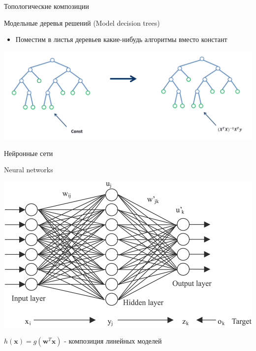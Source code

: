 \documentclass[10pt]{beamer}
\begin{document}
\begin{frame}{Топологические композиции}
\begin{block}{Модельные деревья решений (Model decision trees)}
\end{block}
\begin{itemize}
    \item Поместим в листья деревьев какие-нибудь алгоритмы вместо констант
\end{itemize}
\begin{center}
    \includegraphics[scale=0.25]{images/modeldt.png}
\end{center}
\end{frame}

\begin{frame}{Нейронные сети}
\begin{block}{Neural networks}
\end{block}
\begin{center}
    \includegraphics[scale=0.2]{images/NeuralNetwork.png}
\end{center}
    $h(\mathbf{x}) = g(\mathbf{w}^T \mathbf{x})$ - композиция линейных моделей
\end{frame}
\end{document}
